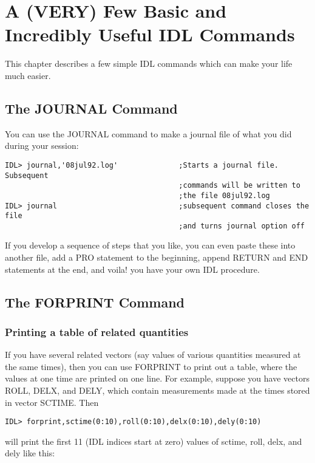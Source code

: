 \chapter{A (VERY) Few Basic and Incredibly Useful IDL Commands }
 
This chapter describes a few simple IDL commands which can make your life much
easier.
 

\section{The JOURNAL Command}
 
You can use the JOURNAL command to make a journal file of what you did during
your session:

\medskip\noindent
\begin{verbatim}
IDL> journal,'08jul92.log'              ;Starts a journal file. Subsequent
                                        ;commands will be written to
                                        ;the file 08jul92.log
IDL> journal                            ;subsequent command closes the file
                                        ;and turns journal option off
\end{verbatim}
If you develop a sequence of steps that you like, you can even paste these into
another file, add a PRO statement to the beginning, append RETURN and END
statements at the end, and voila! you have your own IDL procedure.
 

\section{The FORPRINT Command}
 

\subsection{Printing a table of related quantities}
 
If you have several related vectors (say values of various quantities measured
at the same times), then you can use FORPRINT to print out a table, where the
values at one time are printed on one line. For example, suppose you have
vectors ROLL, DELX, and DELY, which contain measurements made at the times
stored in vector SCTIME. Then

\medskip\noindent
\begin{verbatim}
IDL> forprint,sctime(0:10),roll(0:10),delx(0:10),dely(0:10)
\end{verbatim}
will print the first 11 (IDL indices start at zero) values of sctime, roll,
delx, and dely like this:


